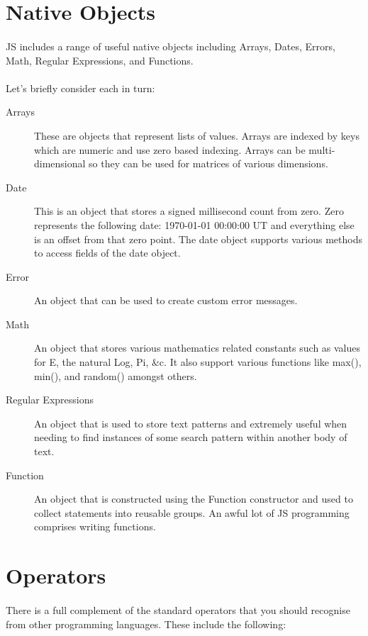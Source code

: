 \section{Native Objects}
\paragraph{} JS includes a range of useful native objects including Arrays, Dates, Errors, Math, Regular Expressions, and Functions.
\paragraph{} Let's briefly consider each in turn:

\begin{description}
\item [Arrays] These are objects that represent lists of values. Arrays are indexed by keys which are numeric and use zero based indexing. Arrays can be multi-dimensional so they can be used for matrices of various dimensions.
\item [Date] This is an object that stores a signed millisecond count from zero. Zero represents the following date: 1970-01-01 00:00:00 UT and everything else is an offset from that zero point. The date object supports various methods to access fields of the date object.
\item [Error] An object that can be used to create custom error messages.
\item [Math] An object that stores various mathematics related constants such as values for E, the natural Log, Pi, \&c. It also support various functions like max(), min(), and random() amongst others.
\item [Regular Expressions] An object that is used to store text patterns and extremely useful when needing to find instances of some search pattern within another body of text.
\item [Function] An object that is constructed using the Function constructor and used to collect statements into reusable groups. An awful lot of JS programming comprises writing functions.
\end{description}



\section{Operators}
\paragraph{} There is a full complement of the standard operators that you should recognise from other programming languages. These include the following:

